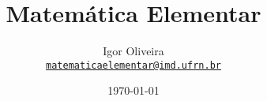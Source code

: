%
%


%
%

\usepackage[utf8]{inputenc}
\usepackage[T1]{fontenc}

\usepackage[brazil]{babel}

\usepackage{amsmath}
\usepackage{amsthm}
\usepackage{amssymb}

\usepackage{csquotes}

\usepackage{hyperref}
\usepackage{tikz}
\usepackage{yfonts}
\usepackage{colortbl}
\usepackage{ragged2e}
\usepackage{helvet}
\usepackage{verbatim}


%
%




%
%

\usepackage{macros/macros}


%
%

\theoremstyle{plain}
\newtheorem{teorema}{Teorema}

\theoremstyle{definition}
\newtheorem{definicao}[teorema]{Definição}

\theoremstyle{remark}
\newtheorem{obs}[teorema]{Observação}
\newtheorem{observacao}[teorema]{Observação}
\newtheorem{corolario}[teorema]{Corolário}
\newtheorem{exemplo}[teorema]{Exemplo}
\newtheorem{lema}[teorema]{Lema}
\newtheorem{proposicao}[teorema]{Proposição}

\newenvironment{exercicio}{\stepcounter{exercicios} \textbf{\arabic{exercicios}}.}{}

\newcommand{\Ex}[1]{\begin{exercicio}#1\end{exercicio}}

%
%

\newcommand{\capitulo}[1]{\lecture[#1]{Capítulo}}
\newcommand{\aula}[1]{\subtitle{#1}}
\newcommand{\autor}{Igor Oliveira}
\newcommand{\email}{\href{mailto:matematicaelementar@imd.ufrn.br}{\texttt{matematicaelementar@imd.ufrn.br}}}
\newcommand{\disciplina}{Matemática Elementar}
\newcommand{\codigo}{IMD1001}

\title{\disciplina}
\date{\today}
\author[\autor]
{
    \autor\\
    \email
}

